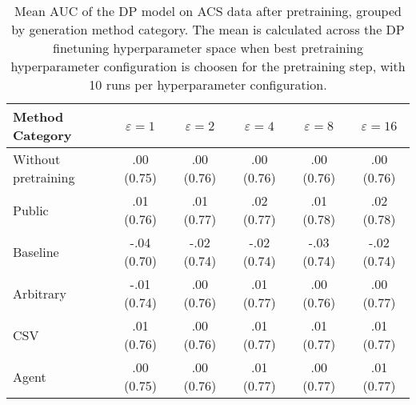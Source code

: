 \begin{table}[h!]
    \centering
    \caption{Mean AUC of the DP model on ACS data after pretraining, grouped by generation method category. The mean is calculated across the DP finetuning hyperparameter space when best pretraining hyperparameter configuration is choosen for the pretraining step, with 10 runs per hyperparameter configuration.}
    \label{tab:epsilon_comparison}
    \begin{tabular}{lccccc}
    \toprule
    Method Category & $\varepsilon=1$ & $\varepsilon=2$ & $\varepsilon=4$ & $\varepsilon=8$ & $\varepsilon=16$ \\
    \midrule
    Without pretraining & .00 {\small (0.75)} & .00 {\small (0.76)} & .00 {\small (0.76)} & .00 {\small (0.76)} & .00 {\small (0.76)} \\
    \arrayrulecolor{black!50!}\midrule
    Public & \cellcolor{gold!30}.01 {\small (0.76)} & \cellcolor{gold!30}.01 {\small (0.77)} & \cellcolor{gold!30}.02 {\small (0.77)} & \cellcolor{gold!30}.01 {\small (0.78)} & \cellcolor{gold!30}.02 {\small (0.78)} \\
    \arrayrulecolor{black!50!}\midrule
    Baseline & -.04 {\small (0.70)} & -.02 {\small (0.74)} & -.02 {\small (0.74)} & -.03 {\small (0.74)} & -.02 {\small (0.74)} \\
    \arrayrulecolor{black!50!}\midrule
    Arbitrary & -.01 {\small (0.74)} & \cellcolor{bronze!30}.00 {\small (0.76)} & \cellcolor{bronze!30}.01 {\small (0.77)} & .00 {\small (0.76)} & .00 {\small (0.77)} \\
    \arrayrulecolor{black!50!}\midrule
    CSV & \cellcolor{silver!30}.01 {\small (0.76)} & \cellcolor{silver!30}.00 {\small (0.76)} & \cellcolor{silver!30}.01 {\small (0.77)} & \cellcolor{silver!30}.01 {\small (0.77)} & \cellcolor{silver!30}.01 {\small (0.77)} \\
    Agent & \cellcolor{bronze!30}.00 {\small (0.75)} & \cellcolor{bronze!30}.00 {\small (0.76)} & \cellcolor{bronze!30}.01 {\small (0.77)} & \cellcolor{bronze!30}.00 {\small (0.77)} & \cellcolor{bronze!30}.01 {\small (0.77)} \\
    \bottomrule
    \end{tabular}
\end{table}